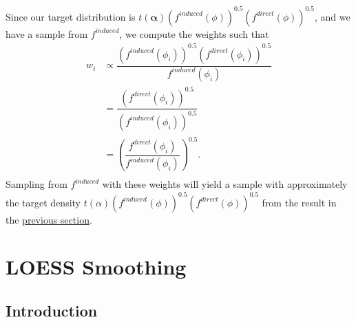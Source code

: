 \documentclass[12pt,twoside]{smiththesis}
\begin{document}
Since our target distribution is \(t(\boldsymbol \alpha) \left( f^{induced} (\phi) \right)^{0.5} \left( f^{direct} (\phi) \right)^{0.5}\), and we have a sample from \(f^{induced}\), we compute the weights such that
\begin{align*} w_i &\propto \dfrac{ \left( f^{induced} (\phi_i) \right)^{0.5} \left( f^{direct} (\phi_i) \right)^{0.5} } {f^{induced}(\phi_i)} \\
&=  \dfrac{ \left( f^{direct} (\phi_i) \right)^{0.5} } {\left( f^{induced} (\phi_i) \right)^{0.5} } \\
&=   \left( \dfrac{  f^{direct} (\phi_i) } { f^{induced} (\phi_i) }  \right)^{0.5}. \\
\end{align*}
Sampling from \(f^{induced}\) with these weights will yield a sample with approximately the target density \(t(\alpha) \left(f^{induced} (\phi) \right)^{0.5} \left( f^{direct} (\phi)\right)^{0.5}\) from the result in the \protect\hyperlink{proof}{previous section}.

\newpage

\hypertarget{loess-smoothing}{%
\section{LOESS Smoothing}\label{loess-smoothing}}

\hypertarget{introduction}{%
\subsection{Introduction}\label{introduction}}
\end{document}
